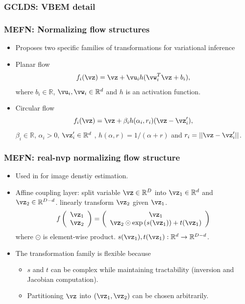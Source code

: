 \documentclass[16pt,presentation]{beamer}
\begin{document}
\begin{frame}
\frametitle{GCLDS: VBEM detail}
\end{frame}



\begin{frame}
\frametitle{MEFN: Normalizing flow structures}
\begin{itemize}
\item \textcite{Rezende2015} Proposes two specific families of transformations for variational inference
\item Planar flow%
\[f_i(\vz) = \vz + \vu_i h(\vw_i^{T} \vz+ b_i),\]
where $b_i \in \mathbb{R}$, $\vu_i, \vw_i \in \mathbb{R}^d$ and $h$ is an activation function. %
\item Circular flow
\[f_i(\vz) = \vz + \beta_i h(\alpha_i, r_i)(\vz - \vz'_i),\]
$\beta_i \in \mathbb{R}$, $\alpha_i >0$, $\vz'_i \in \mathbb{R}^d$ , $h(\alpha,r)=1/(\alpha+r)$ and $r_i = ||\vz-\vz'_i||$.
\end{itemize}
\end{frame}

\begin{frame}
\frametitle{MEFN: real-nvp normalizing flow structure}
\begin{itemize}
\item Used in \textcite{dinh2016density} for image denstiy estimation.
\item Affine coupling layer: split variable $\vz \in \mathbb{R}^D$ into $\vz_1 \in \mathbb{R}^d$ and $\vz_2 \in \mathbb{R}^{D-d}$. linearly transform $\vz_2$ given $\vz_1$. 
\[f\left(\begin{array}{c} \vz_1\\ \vz_2 \end{array} \right) = 
\left(\begin{array}{c} \vz_1 \\ \vz_2 \odot \exp \left( s(\vz_1) \right) + t(\vz_1) \end{array}\right) \]
where $\odot$ is element-wise product. $s(\vz_1), t(\vz_1): \mathbb{R}^d \rightarrow \mathbb{R}^{D-d}$.
\item The transformation family is flexible because
\begin{itemize}
\item $s$ and $t$ can be complex while maintaining tractability (inversion and Jacobian computation). %
\item Partitioning $\vz$ into $(\vz_1, \vz_2)$ can be chosen arbitrarily.
\end{itemize}
\end{itemize}
\end{frame}
\end{document}
